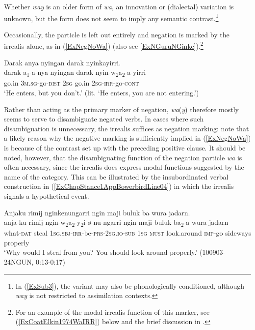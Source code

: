 \documentclass[output=paper,colorlinks,citecolor=brown]{langscibook}
\begin{document}
Whether \textit{way} is an older form of \textit{wa}, an innovation or (dialectal) variation is unknown, but the form does not seem to imply any semantic contrast.\footnote{In (\ref{ExSub3}), the variant may also be phonologically conditioned, although \textit{way} is not restricted to assimilation contexts.}

Occasionally, the particle is left out entirely and negation is marked by the irrealis alone, as in (\ref{ExNegNoWa}) (also see \ref{ExNGuruNGinke}).\footnote{For an example of the modal irrealis function of this marker, see (\ref{ExCoatElkin1974WaIRR}) below and the brief discussion in .}

\ea\label{ExNegNoWa}
    \glll Darak anya nyingan darak nyinkayirri. \\
        darak a\textsubscript{1}-a-nya nyingan darak nyin-w\textsubscript{2}a\textsubscript{2}-a-yirri\\
        go.in 3\textsc{m.sg}-go-\textsc{dist} 2\textsc{sg} go.in 2\textsc{sg}-\textsc{irr}-go-\textsc{cont}\\
    \trans `He enters, but you don't.' (lit. `He enters, you are not entering.') \citep[118, line 285]{Coate1966}
\z

Rather than acting as the primary marker of negation, \textit{wa}(\textit{y}) therefore mostly seems to serve to disambiguate negated verbs. In cases where such disambiguation is unnecessary, the irrealis suffices as negation marking: note that a likely reason why the negative marking is sufficiently implied in (\ref{ExNegNoWa}) is because of the contrast set up with the preceding positive clause. It should be noted, however, that the disambiguating function of the negation particle \textit{wa} is often necessary, since the irrealis does express modal functions suggested by the name of the category. This can be illustrated by the insubordinated verbal construction in (\ref{ExChapStance1AppBowerbirdLine04}) in which the irrealis signals a hypothetical event.

\begin{exe}
\ex \label{ExChapStance1AppBowerbirdLine04}
\glll Anjaku rimij nginkenungarri ngin maji buluk ba wura jadarn.\\
anja-ku rimij ngin-w\textsubscript{2}a\textsubscript{2}-y\textsubscript{2}i-{\o}-nu-ngarri ngin maji buluk ba\textsubscript{2}-a wura jadarn\\
what-\textsc{dat} steal 1\textsc{sg.sbj-irr}-be-\textsc{prs}-2\textsc{sg}.\textsc{io}-\textsc{sub} 1\textsc{sg} \textsc{must} look.around \textsc{imp}-go sideways properly\\
\trans `Why would I steal from you? You should look around properly.' (100903-24NGUN, 0:13-0:17)
\end{exe}
\end{document}
